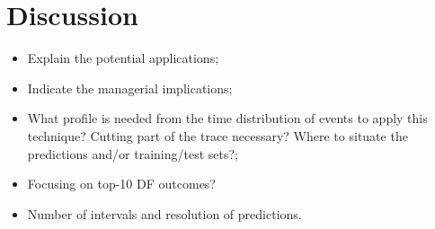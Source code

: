 \section{Discussion}\label{sec:discussion}

\begin{itemize}
    \item Explain the potential applications;
    \item Indicate the managerial implications;
    \item What profile is needed from the time distribution of events to apply this technique? Cutting part of the trace necessary? Where to situate the predictions and/or training/test sets?;
    \item Focusing on top-10 DF outcomes?
    \item Number of intervals and resolution of predictions.
\end{itemize}